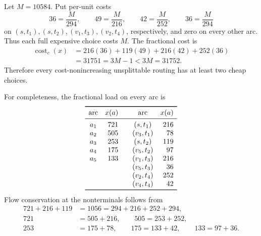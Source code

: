 \documentclass[11pt]{article}
\theoremstyle{remark}
\newcommand{\cost}{\operatorname{cost}}
\begin{document}
Let $M=10584$.  Put per-unit costs
\[
 36=\frac{M}{294},
 \qquad
 49=\frac{M}{216},
 \qquad
 42=\frac{M}{252},
 \qquad
 36=\frac{M}{294}
\]
on $(s,t_1),(s,t_2),(v_1,t_3),(v_2,t_4)$, respectively, and zero on every
other arc.  Thus each full expensive choice costs $M$.  The fractional cost
is
\begin{align*}
\cost_c(x)
 &=216(36)+119(49)+216(42)+252(36)\\
 &=31751
 =3M-1
 <3M=31752.
\end{align*}
Therefore every cost-nonincreasing unsplittable routing has at least two
cheap choices.

For completeness, the fractional load on every arc is
\[
\begin{array}{c@{\quad}r@{\qquad}c@{\quad}r}
\toprule
\text{arc}&x(a)&\text{arc}&x(a)\\
\midrule
 a_1&721&(s,t_1)&216\\
 a_2&505&(v_3,t_1)&78\\
 a_3&253&(s,t_2)&119\\
 a_4&175&(v_5,t_2)&97\\
 a_5&133&(v_1,t_3)&216\\
 &&(v_5,t_3)&36\\
 &&(v_2,t_4)&252\\
 &&(v_4,t_4)&42\\
\bottomrule
\end{array}
\]
Flow conservation at the nonterminals follows from
\[
\begin{aligned}
721+216+119&=1056=294+216+252+294,\\
721&=505+216,\qquad 505=253+252,\\
253&=175+78,\qquad 175=133+42,\qquad 133=97+36.
\end{aligned}
\]
\end{document}
